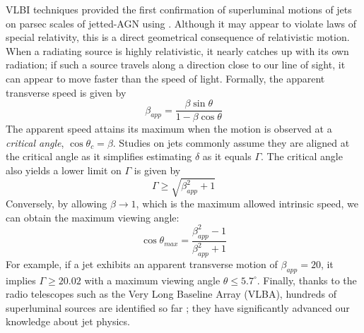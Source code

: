 VLBI techniques provided the first confirmation of superluminal motions of jets on parsec scales of jetted-AGN using  \citep{whitney1971quasars}. Although it may appear to violate laws of special relativity, this is a direct geometrical consequence of relativistic motion. When a radiating source is highly relativistic, it nearly catches up with its own radiation; if such a source travels along a direction close to our line of sight, it can appear to move faster than the speed of light. Formally, the apparent transverse speed is given by
\begin{equation}
    \beta_{app}=\frac{\beta\sin{\theta}}{1-\beta\cos{\theta}}
\end{equation}
The apparent speed attains its maximum when the motion is observed at a \textit{critical angle}, $\cos{\theta_c}=\beta$. Studies on jets commonly assume they are aligned at the critical angle as it simplifies estimating $\delta$ as it equals $\Gamma$. The critical angle also yields a lower limit on $\Gamma$ is given by
\begin{equation}
    \Gamma\geq\sqrt{\beta_{app}^2+1}
\end{equation}
Conversely, by allowing $\beta\to1$, which is the maximum allowed intrinsic speed, we can obtain the maximum viewing angle:
\begin{equation}
    \cos{\theta_{max}}=\frac{\beta_{app}^2-1}{\beta_{app}^2+1}
\end{equation}
For example, if a jet exhibits an apparent transverse motion of $\beta_{app}=20$, it implies $\Gamma\geq20.02$ with a maximum viewing angle $\theta\leq5.7^\circ$.
Finally, thanks to the radio telescopes such as the Very Long Baseline Array (VLBA), hundreds of superluminal sources are identified so far \citep[e.g.,][]{2018ApJS..234...12L}; they have significantly advanced our knowledge about jet physics.
